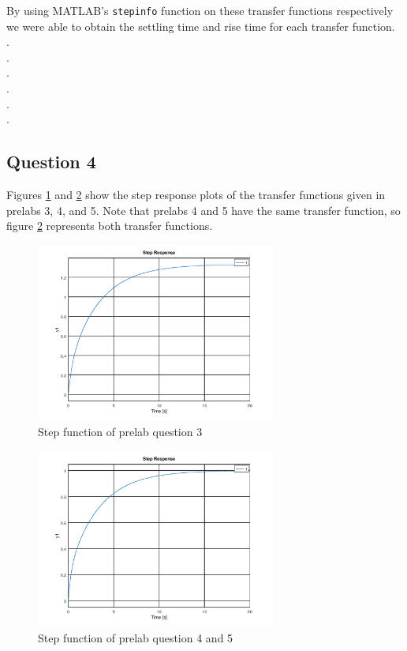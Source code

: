 \documentclass[12pt, a4paper]{article}
\begin{document}
		By using MATLAB's \texttt{stepinfo} function on these transfer functions respectively we were able to obtain the  settling time and rise time for each transfer function. \\
		.\\
		.\\
		.\\
		.\\
		.\\
		.\\

		

		\subsection{Question 4} %
		\label{sub:question_4}
			Figures \ref{fig:4_1} and \ref{fig:4_2} show the step response plots of the transfer functions given in prelabs 3, 4, and 5. Note that prelabs 4 and 5 have the same transfer function, so figure \ref{fig:4_2}	represents both transfer functions.
			\begin{figure}[H]
				\centering
				\includegraphics[width=0.7\textwidth]{Images/question_4_1_lab.png}
				\caption{Step function of prelab question 3}
				\label{fig:4_1} 
			\end{figure}

			\begin{figure}[H]
				\centering
				\includegraphics[width=0.7\textwidth]{Images/question_4_2_lab.png}
				\caption{Step function of prelab question 4 and 5}
				\label{fig:4_2} 
			\end{figure}
		
\end{document}
